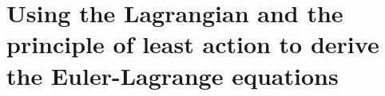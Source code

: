 
\chapter{Using the Lagrangian and the principle of least action to derive the Euler-Lagrange equations}

